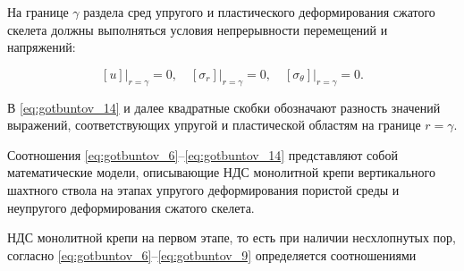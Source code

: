 На границе $\gamma$ раздела сред упругого и пластического деформирования сжатого скелета должны выполняться условия непрерывности перемещений и напряжений: 

\begin{equation} 

\label{eq:gotbuntov_14} 

\left. [u]\right|_{r=\gamma } =0,\quad  \left. [\sigma _{r} ]\right|_{r=\gamma } =0,\quad  \left. [\sigma _{\theta } ]\right|_{r=\gamma } =0. 

\end{equation} 



В \eqref{eq:gotbuntov_14} и далее квадратные скобки обозначают разность значений выражений, соответствующих упругой и пластической областям на границе $r=\gamma$.



Соотношения \eqref{eq:gotbuntov_6}--\eqref{eq:gotbuntov_14} представляют собой математические модели, описывающие НДС монолитной крепи вертикального шахтного ствола на этапах упругого деформирования пористой среды и неупругого деформирования сжатого скелета.



НДС монолитной крепи на первом этапе, то есть при наличии несхлопнутых пор, согласно \eqref{eq:gotbuntov_6}--\eqref{eq:gotbuntov_9} определяется соотношениями

